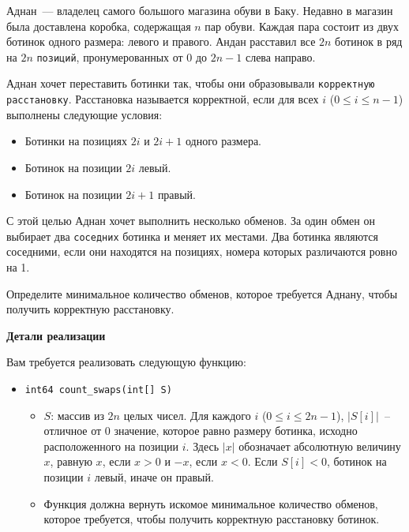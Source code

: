 Аднан~--- владелец самого большого магазина обуви в Баку. Недавно в магазин
была доставлена коробка, содержащая $n$ пар обуви. Каждая пара состоит из двух
ботинок одного размера: левого и правого. Андан расставил все $2n$ ботинок в ряд
на $2n$ \texttt{позиций}, пронумерованных от $0$ до $2n - 1$ слева направо.

Аднан хочет переставить ботинки так, чтобы они образовывали \texttt{корректную
расстановку}. Расстановка называется корректной, если для всех $i$ ($0 \leq i \leq n-1$)
выполнены следующие условия:
\begin{itemize}
\item Ботинки на позициях $2i$ и $2i+1$ одного размера.
\item Ботинок на позиции $2i$ левый.
\item Ботинок на позиции $2i+1$ правый.
\end{itemize}

С этой целью Аднан хочет выполнить несколько обменов. За один обмен он
выбирает два \texttt{соседних} ботинка и меняет их местами. Два ботинка являются
соседними, если они находятся на позициях, номера которых различаются ровно
на 1.

Определите минимальное количество обменов, которое требуется Аднану, чтобы
получить корректную расстановку.

\textbf{Детали реализации}

Вам требуется реализовать следующую функцию:

\begin{itemize}
\item \texttt{int64 count\_swaps(int[] S)}
\begin{itemize}
\item $S$: массив из $2n$ целых чисел.
Для каждого $i$ ($0 \leq i \leq 2n-1$), $|S[i]|$~-- отличное
от 0 значение, которое равно размеру ботинка, исходно расположенного на
позиции $i$. Здесь $|x|$ обозначает абсолютную величину $x$, равную $x$, если $x>0$ и $-x$, если $x<0$. Если $S[i] < 0$, ботинок на позиции $i$ левый, иначе он правый.
\item Функция должна вернуть искомое минимальное количество обменов, которое
требуется, чтобы получить корректную расстановку ботинок.
\end{itemize}
\end{itemize}

